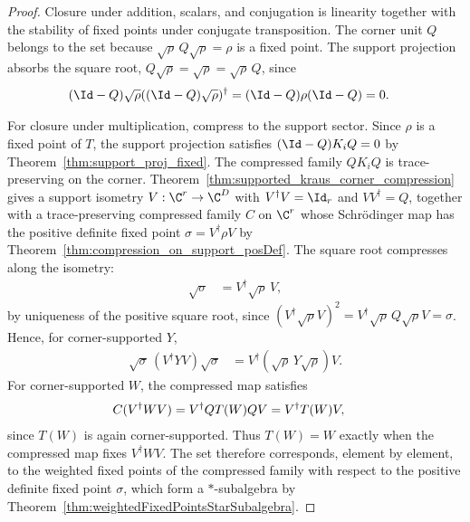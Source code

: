 \begin{proof}
    \leanok
    Closure under addition, scalars, and conjugation is linearity together
    with the stability of fixed points under conjugate transposition. The
    corner unit $Q$ belongs to the set because
    $\sqrt{\rho}\,Q\sqrt{\rho}=\rho$ is a fixed point. The support projection
    absorbs the square root, $Q\sqrt{\rho}=\sqrt{\rho}=\sqrt{\rho}\,Q$,
    since
    \begin{align}
        (\Id-Q)\sqrt{\rho}
        ((\Id-Q)\sqrt{\rho})^\dagger
         & =(\Id-Q)\rho(\Id-Q)=0.
        \notag
    \end{align}

    For closure under multiplication, compress to the support sector. Since
    $\rho$ is a fixed point of $T$, the support projection satisfies
    $(\Id-Q)K_iQ=0$ by Theorem~\ref{thm:support_proj_fixed}. The compressed
    family $QK_iQ$ is trace-preserving on the corner.
    Theorem~\ref{thm:supported_kraus_corner_compression} gives a support
    isometry $V:\C^r\to\C^D$ with $V^\dagger V=\Id_r$ and
    $VV^\dagger=Q$, together with a trace-preserving compressed
    family $C$ on $\C^r$ whose Schr\"odinger map has the positive definite
    fixed point $\sigma=V^\dagger\rho V$ by
    Theorem~\ref{thm:compression_on_support_posDef}. The square root
    compresses along the isometry:
    \begin{align}
        \sqrt{\sigma}
         & =V^\dagger\sqrt{\rho}\,V,
        \label{eq:spectral_ds_sqrt_compression}
    \end{align}
    by uniqueness of the positive square root, since
    $(V^\dagger\sqrt{\rho}V)^2
        =V^\dagger\sqrt{\rho}\,Q\sqrt{\rho}V=\sigma$.
    Hence, for corner-supported $Y$,
    \begin{align}
        \sqrt{\sigma}\,(V^\dagger YV)\sqrt{\sigma}
         & =V^\dagger(\sqrt{\rho}\,Y\sqrt{\rho})V.
        \label{eq:spectral_ds_weighted_transport}
    \end{align}
    For corner-supported $W$, the compressed map satisfies
    \begin{align}
        C(V^\dagger WV)
         & =V^\dagger QT(W)QV
        =V^\dagger T(W)V,
        \notag
    \end{align}
    since $T(W)$ is again corner-supported. Thus $T(W)=W$ exactly when the
    compressed map fixes $V^\dagger WV$. The set therefore corresponds,
    element by element, to the weighted fixed points of the compressed
    family with respect to the positive definite fixed point $\sigma$,
    which form a $*$-subalgebra by
    Theorem~\ref{thm:weightedFixedPointsStarSubalgebra}.


\end{proof}
